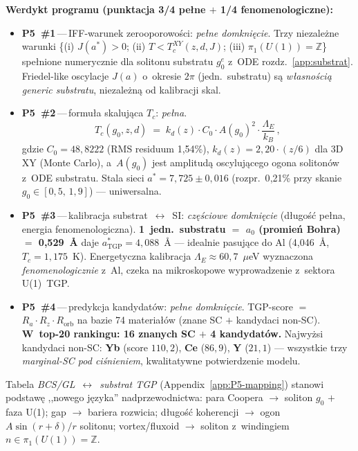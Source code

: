 \medskip\noindent\textbf{Werdykt programu (punktacja 3/4 pe\l{}ne $+$ 1/4 fenomenologiczne):}
\begin{itemize}\itemsep0pt
  \item \textbf{P5~\#1}\,---\,IFF-warunek zerooporowo\'sci: \emph{pe\l{}ne domkni\k{e}cie}.
    Trzy niezale\.zne warunki \{(i) $J(a^*)>0$; (ii) $T<T_c^{XY}(z,d,J)$;
    (iii) $\pi_1(U(1))=\mathbb{Z}$\} spe\l{}nione numerycznie dla solitonu
    substratu $g_0^e$ z~ODE rozdz.~\ref{app:substrat}. Friedel-like oscylacje
    $J(a)$ o~okresie $2\pi$ (jedn.~substratu) s\k{a} \emph{w\l{}asno\'sci\k{a}
    generic substratu}, niezale\.zn\k{a} od kalibracji skal.
  \item \textbf{P5~\#2}\,---\,formu\l{}a skaluj\k{a}ca $T_c$: \emph{pe\l{}na}.
    \[
      \boxed{\quad T_c(g_0, z, d)
      \;=\;
      k_d(z)\cdot C_0 \cdot A(g_0)^2 \cdot \frac{\Lambda_E}{k_B}\,,
      \quad}
    \]
    gdzie $C_0 = 48{,}8222$ (RMS residuum 1{,}54\%),
    $k_d(z) = 2{,}20\cdot (z/6)$ dla 3D XY (Monte Carlo),
    a~$A(g_0)$ jest amplitud\k{a} oscyluj\k{a}cego ogona soliton\'ow
    z~ODE substratu. Stala sieci $a^* = 7{,}725 \pm 0{,}016$
    (rozpr.~0{,}21\% przy skanie $g_0 \in [0{,}5,\,1{,}9]$) --- uniwersalna.
  \item \textbf{P5~\#3}\,---\,kalibracja substrat~$\leftrightarrow$~SI:
    \emph{cz\k{e}\'sciowe domkni\k{e}cie} (d\l{}ugo\'s\'c pe\l{}na, energia fenomenologiczna).
    \textbf{1~jedn.~substratu $=$ $a_0$ (promie\'n Bohra) $=$ 0{,}529~\AA}
    daje $a^*_\text{TGP} = 4{,}088$~\AA{} --- idealnie pasuj\k{a}ce do Al
    (4{,}046~\AA, $T_c = 1{,}175$~K). Energetyczna kalibracja
    $\Lambda_E \approx 60{,}7$~$\mu$eV wyznaczona \emph{fenomenologicznie}
    z~Al, czeka na mikroskopowe wyprowadzenie z~sektora U(1)~TGP.
  \item \textbf{P5~\#4}\,---\,predykcja kandydat\'ow: \emph{pe\l{}ne domkni\k{e}cie}.
    TGP-score $=$ $R_a\cdot R_z\cdot R_\text{orb}$ na bazie 74 materia\l{}\'ow
    (znane SC $+$ kandydaci non-SC). \textbf{W~top-20 rankingu: 16 znanych SC $+$ 4 kandydat\'ow.}
    Najwy\.zsi kandydaci non-SC: \textbf{Yb} (score $110{,}2$),
    \textbf{Ce} ($86{,}9$), \textbf{Y} ($21{,}1$)
    --- wszystkie trzy \emph{marginal-SC pod ci\'snieniem},
    kwalitatywne potwierdzenie modelu.
\end{itemize}

\medskip\noindent
Tabela \emph{BCS/GL}~$\leftrightarrow$~\emph{substrat TGP} (Appendix~\ref{app:P5-mapping})
stanowi podstaw\k{e} ,,nowego j\k{e}zyka'' nadprzewodnictwa:
para Coopera $\to$ soliton $g_0$ $+$ faza U(1); gap $\to$ bariera rozwicia;
d\l{}ugo\'s\'c koherencji $\to$ ogon $A\sin(r+\delta)/r$ solitonu;
vortex/fluxoid $\to$ soliton z~windingiem $n\in\pi_1(U(1))=\mathbb{Z}$.

